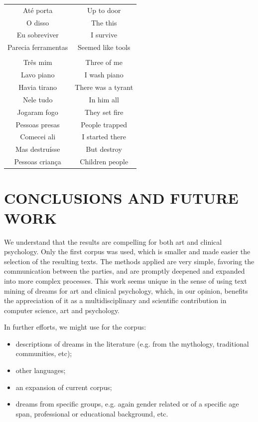 \documentclass[12pt,fleqn]{article}
\begin{document}
\begin{table}[H]
\begin{tabular}{  c | c }
Até porta                        &                                                Up to door              \\
O disso                          &                                                The this                    \\
Eu sobreviver                    &                                                I survive               \\
	Parecia ferramentas              & Seemed like tools                             \\
  & \\
	Três mim          & Three of me \\
	Lavo piano         & I wash piano \\
	Havia tirano & There was a tyrant \\
	Nele tudo & In him all \\
	Jogaram fogo & They set fire \\
	Pessoas presas &  People trapped \\
	Comecei ali & I started there \\
	Mas destruísse & But destroy \\
	Pessoas criança & Children people
\end{tabular}
\end{table}

\newpage %

\section{CONCLUSIONS AND FUTURE WORK}\label{sec:conc}
We understand that the results are compelling for both art and clinical psychology.
Only the first corpus was used, which is smaller and made easier the selection of the resulting texts.
The methods applied are very simple, favoring the communication between the parties,
and are promptly deepened and expanded into more complex processes.
This work seems unique in the sense of using text mining of dreams for art and clinical psychology,
which, in our opinion, benefits the appreciation of it as a multidisciplinary and scientific contribution
in computer science, art and psychology.

In further efforts,
we might use for the corpus:
\begin{itemize}
	\item descriptions of dreams in the literature (e.g. from the mythology, traditional communities, etc); 
	\item other languages;
	\item an expansion of current corpus;
	\item dreams from specific groups, e.g. again gender related or of a specific age span, professional or educational background, etc.
\end{itemize}
\end{document}
